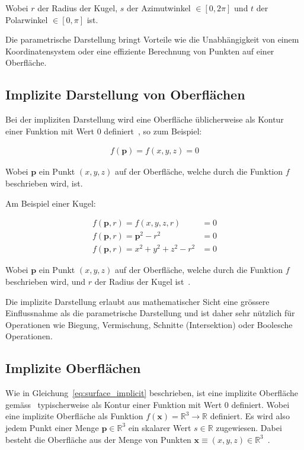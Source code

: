 Wobei $r$ der Radius der Kugel, $s$ der Azimutwinkel $\in [0, 2\pi]$ und
$t$ der Polarwinkel $\in [0, \pi]$ ist.

Die parametrische Darstellung bringt Vorteile wie die Unabhängigkeit von
einem Koordinatensystem oder eine effiziente Berechnung von Punkten auf
einer Oberfläche.

\subsection{Implizite Darstellung von Oberflächen}
\label{subsec:surfaces:display:implicit}

Bei der impliziten Darstellung wird eine Oberfläche üblicherweise als Kontur
einer Funktion mit Wert 0 definiert~\parencite[S.
1]{menon_introduction_1996}, so zum Beispiel:

\begin{gather}\label{eq:surface_implicit}
    f(\bm{p}) = f(x, y, z) = 0
\end{gather}

Wobei $\bm{p}$ ein Punkt $(x, y, z)$ auf der Oberfläche, welche durch die Funktion
$f$ beschrieben wird, ist.

Am Beispiel einer Kugel:

\begin{align}\label{eq:sphere_implicit}
    f(\bm{p}, r) = f(x, y, z, r) &= 0 \\
    f(\bm{p}, r) = \bm{p}^{2} - r^{2} &= 0 \\
    f(\bm{p}, r) = x^{2} + y^{2} + z^{2} - r^{2} &= 0
\end{align}

Wobei $\bm{p}$ ein Punkt $(x, y, z)$ auf der Oberfläche, welche durch
die Funktion $f$ beschrieben wird, und $r$ der Radius der Kugel
ist~\parencite[S. 91]{glassner_introduction_1989}.

Die implizite Darstellung erlaubt aus mathematischer Sicht eine grössere
Einflussnahme als die parametrische Darstellung und ist daher sehr
nützlich für Operationen wie Biegung, Vermischung, Schnitte
(Intersektion) oder Boolesche Operationen.

\subsection{Implizite Oberflächen}
\label{subsec:implicit_surfaces}

Wie in Gleichung~\ref{eq:surface_implicit} beschrieben, ist eine implizite
Oberfläche gemäss~\citeauthor{menon_introduction_1996} typischerweise als
Kontur einer Funktion mit Wert 0 definiert.
Wobei~\citeauthor{hart_ray_1993} eine implizite Oberfläche als
Funktion $ f(\bm{x}) = \mathbb{R}^{3} \to \mathbb{R} $ definiert.  Es
wird also jedem Punkt einer Menge $ \bm{p} \in \mathbb{R}^{3} $ ein
skalarer Wert $ s \in \mathbb{R} $ zugewiesen. Dabei besteht die
Oberfläche aus der Menge von Punkten $ \bm{x} \equiv (x, y, z) \in
\mathbb{R}^{3} $~\parencite[S. 527]{hart_sphere_1994}.

